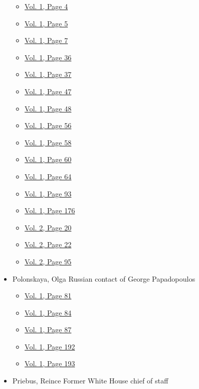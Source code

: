 \begin{itemize}
  \begin{itemize}
  \tightlist
  \item
    \protect\hyperlink{g-page-12}{Vol. 1, Page 4}
  \item
    \protect\hyperlink{g-page-13}{Vol. 1, Page 5}
  \item
    \protect\hyperlink{g-page-15}{Vol. 1, Page 7}
  \item
    \protect\hyperlink{g-page-44}{Vol. 1, Page 36}
  \item
    \protect\hyperlink{g-page-45}{Vol. 1, Page 37}
  \item
    \protect\hyperlink{g-page-55}{Vol. 1, Page 47}
  \item
    \protect\hyperlink{g-page-56}{Vol. 1, Page 48}
  \item
    \protect\hyperlink{g-page-64}{Vol. 1, Page 56}
  \item
    \protect\hyperlink{g-page-66}{Vol. 1, Page 58}
  \item
    \protect\hyperlink{g-page-68}{Vol. 1, Page 60}
  \item
    \protect\hyperlink{g-page-72}{Vol. 1, Page 64}
  \item
    \protect\hyperlink{g-page-101}{Vol. 1, Page 93}
  \item
    \protect\hyperlink{g-page-184}{Vol. 1, Page 176}
  \item
    \protect\hyperlink{g-page-232}{Vol. 2, Page 20}
  \item
    \protect\hyperlink{g-page-234}{Vol. 2, Page 22}
  \item
    \protect\hyperlink{g-page-307}{Vol. 2, Page 95}
  \end{itemize}
\item
  Polonskaya, Olga Russian contact of George Papadopoulos

  \begin{itemize}
  \tightlist
  \item
    \protect\hyperlink{g-page-89}{Vol. 1, Page 81}
  \item
    \protect\hyperlink{g-page-92}{Vol. 1, Page 84}
  \item
    \protect\hyperlink{g-page-95}{Vol. 1, Page 87}
  \item
    \protect\hyperlink{g-page-200}{Vol. 1, Page 192}
  \item
    \protect\hyperlink{g-page-201}{Vol. 1, Page 193}
  \end{itemize}
\item
  Priebus, Reince Former White House chief of staff


\end{itemize}
